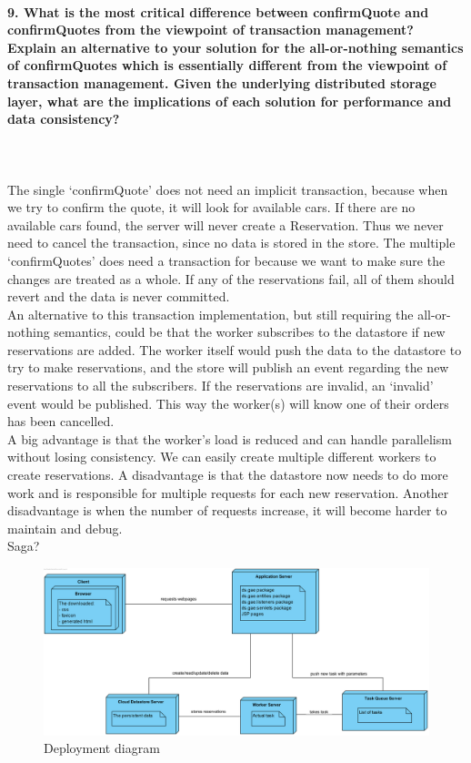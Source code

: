 \documentclass{ds-report}
\begin{document}
	\paragraph{9. What is the most critical difference between confirmQuote and confirmQuotes from the viewpoint of transaction management? Explain an alternative to your solution for the all-or-nothing semantics of confirmQuotes which is essentially different from the viewpoint of transaction management. Given the underlying distributed storage layer, what are the implications of each solution for performance and data consistency?} \mbox{}\\\\
	The single `confirmQuote' does not need an implicit transaction, because when we try to confirm the quote, it will look for available cars. If there are no available cars found, the server will never create a Reservation. Thus we never need to cancel the transaction, since no data is stored in the store.
	The multiple `confirmQuotes' does need a transaction for because we want to make sure the changes are treated as a whole. If any of the reservations fail, all of them should revert and the data is never committed. \\
	An alternative to this transaction implementation, but still requiring the all-or-nothing semantics, could be that the worker subscribes to the datastore if new reservations are added. The worker itself would push the data to the datastore to try to make reservations, and the store will publish an event regarding the new reservations to all the subscribers. If the reservations are invalid, an `invalid' event would be published. This way the worker(s) will know one of their orders has been cancelled.\\
	A big advantage is that the worker's load is reduced and can handle parallelism without losing consistency. We can easily create multiple different workers to create reservations. A disadvantage is that the datastore now needs to do more work and is responsible for multiple requests for each new reservation. Another disadvantage is when the number of requests increase, it will become harder to maintain and debug. \\
	
	Saga?
	
	
	
	
	
		\clearpage

\begin{figure}
  \includegraphics[width=\linewidth]{GAE_opdracht_2_deployment.png}
  \caption{Deployment diagram}
  \label{fig:deployment_diagram}
\end{figure}	
\end{document}
